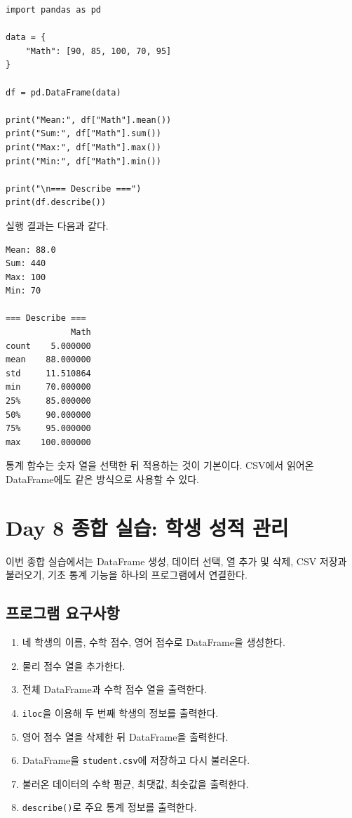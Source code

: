 \documentclass[11pt,a4paper]{article}
\begin{document}
\begin{lstlisting}
import pandas as pd

data = {
    "Math": [90, 85, 100, 70, 95]
}

df = pd.DataFrame(data)

print("Mean:", df["Math"].mean())
print("Sum:", df["Math"].sum())
print("Max:", df["Math"].max())
print("Min:", df["Math"].min())

print("\n=== Describe ===")
print(df.describe())
\end{lstlisting}

실행 결과는 다음과 같다.

\begin{verbatim}
Mean: 88.0
Sum: 440
Max: 100
Min: 70

=== Describe ===
             Math
count    5.000000
mean    88.000000
std     11.510864
min     70.000000
25%     85.000000
50%     90.000000
75%     95.000000
max    100.000000
\end{verbatim}

\begin{importantbox}
통계 함수는 숫자 열을 선택한 뒤 적용하는 것이 기본이다. CSV에서 읽어온 DataFrame에도 같은 방식으로 사용할 수 있다.
\end{importantbox}

\section{Day 8 종합 실습: 학생 성적 관리}

이번 종합 실습에서는 DataFrame 생성, 데이터 선택, 열 추가 및 삭제, CSV 저장과 불러오기, 기초 통계 기능을 하나의 프로그램에서 연결한다.

\subsection{프로그램 요구사항}

\begin{enumerate}[leftmargin=1.8em]
    \item 네 학생의 이름, 수학 점수, 영어 점수로 DataFrame을 생성한다.
    \item 물리 점수 열을 추가한다.
    \item 전체 DataFrame과 수학 점수 열을 출력한다.
    \item \texttt{iloc}을 이용해 두 번째 학생의 정보를 출력한다.
    \item 영어 점수 열을 삭제한 뒤 DataFrame을 출력한다.
    \item DataFrame을 \texttt{student.csv}에 저장하고 다시 불러온다.
    \item 불러온 데이터의 수학 평균, 최댓값, 최솟값을 출력한다.
    \item \texttt{describe()}로 주요 통계 정보를 출력한다.
\end{enumerate}
\end{document}
